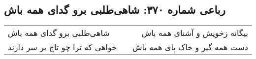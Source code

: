 \begin{center}
\section*{رباعی شماره ۳۷۰: شاهی‌طلبی برو گدای همه باش}
\label{sec:sh370}
\begin{longtable}{l p{0.5cm} r}
شاهی‌طلبی برو گدای همه باش
&&
بیگانه زخویش و آشنای همه باش
\\
خواهی که ترا چو تاج بر سر دارند
&&
دست همه گیر و خاک پای همه باش
\\
\end{longtable}
\end{center}
